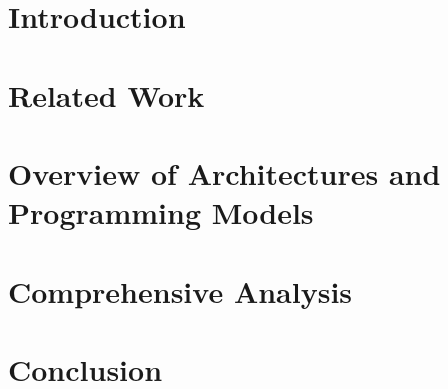 \documentclass[10pt]{sig-alternate-05-2015}
\begin{document}
\printccsdesc



\section{Introduction}
\label{sec:INTRODUCTION}


\section{Related Work}
\label{sec:RELATED_WORK}


\section{Overview of Architectures and Programming Models}
\label{sec:OVERVIEW}


\section{Comprehensive Analysis}
\label{sec:PERFORMANCE}


\section{Conclusion}
\label{sec:CONCLUSION}


\small{


}
\end{document}
